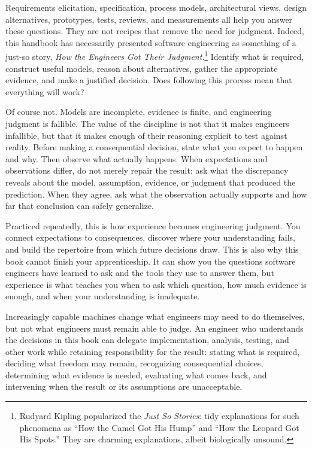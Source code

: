 Requirements elicitation, specification, process models, architectural views, design alternatives,
prototypes, tests, reviews, and measurements all help you answer these questions. They are not
recipes that remove the need for judgment. Indeed, this handbook has necessarily presented software
engineering as something of a just-so story, \emph{How the Engineers Got Their Judgment}.\footnote{Rudyard Kipling popularized the \emph{Just So Stories}: tidy explanations for such phenomena
  as ``How the Camel Got His Hump'' and ``How the Leopard Got His Spots.'' They are charming
  explanations, albeit biologically unsound.} Identify what is required, construct useful
models, reason about alternatives, gather the appropriate evidence, and make a justified decision.
Does following this process mean that everything will work?

Of course not. Models are incomplete, evidence is finite, and engineering judgment is fallible. The
value of the discipline is not that it makes engineers infallible, but that it makes enough of
their reasoning explicit to test against reality. Before making a consequential decision, state
what you expect to happen and why. Then observe what actually happens. When expectations and
observations differ, do not merely repair the result: ask what the discrepancy reveals about the
model, assumption, evidence, or judgment that produced the prediction. When they agree, ask what
the observation actually supports and how far that conclusion can safely generalize.

Practiced repeatedly, this is how experience becomes engineering judgment. You connect expectations
to consequences, discover where your understanding fails, and build the repertoire from which
future decisions draw. This is also why this book cannot finish your apprenticeship. It can show
you the questions software engineers have learned to ask and the tools they use to answer them,
but experience is what teaches you when to ask which question, how much evidence is enough, and
when your understanding is inadequate.

Increasingly capable machines change what engineers may need to do themselves, but not what
engineers must remain able to judge. An engineer who understands the decisions in this book can
delegate implementation, analysis, testing, and other work while retaining responsibility for the
result: stating what is required, deciding what freedom may remain, recognizing consequential
choices, determining what evidence is needed, evaluating what comes back, and intervening when the
result or its assumptions are unacceptable.

